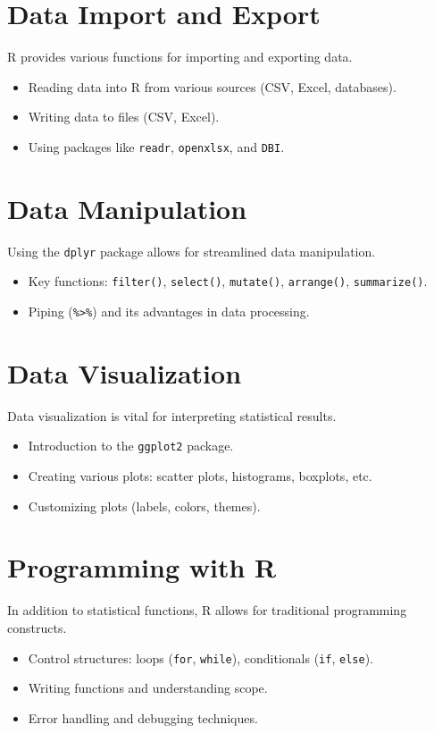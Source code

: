 \documentclass[12pt]{book}
\begin{document}
\section{Data Import and Export}
R provides various functions for importing and exporting data.
\begin{itemize}
    \item Reading data into R from various sources (CSV, Excel, databases).
    \item Writing data to files (CSV, Excel).
    \item Using packages like \texttt{readr}, \texttt{openxlsx}, and \texttt{DBI}.
\end{itemize}

\section{Data Manipulation}
Using the \texttt{dplyr} package allows for streamlined data manipulation.
\begin{itemize}
    \item Key functions: \texttt{filter()}, \texttt{select()}, \texttt{mutate()}, \texttt{arrange()}, \texttt{summarize()}.
    \item Piping (\texttt{\%>\%}) and its advantages in data processing.
\end{itemize}

\section{Data Visualization}
Data visualization is vital for interpreting statistical results.
\begin{itemize}
    \item Introduction to the \texttt{ggplot2} package.
    \item Creating various plots: scatter plots, histograms, boxplots, etc.
    \item Customizing plots (labels, colors, themes).
\end{itemize}

\section{Programming with R}
In addition to statistical functions, R allows for traditional programming constructs.
\begin{itemize}
    \item Control structures: loops (\texttt{for}, \texttt{while}), conditionals (\texttt{if}, \texttt{else}).
    \item Writing functions and understanding scope.
    \item Error handling and debugging techniques.
\end{itemize}
\end{document}
